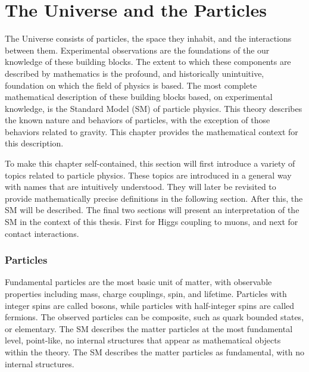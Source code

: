 
\section{The Universe and the Particles}

The Universe consists of particles, the space they inhabit, and the interactions between them.
Experimental observations are the foundations of the our knowledge of these building blocks.
The extent to which these components are described by mathematics is the profound, and historically unintuitive, foundation on which the field of physics is based.
The most complete mathematical description of these building blocks based, on experimental knowledge, is the Standard Model (SM) of particle physics.
This theory describes the known nature and behaviors of particles, with the exception of those behaviors related to gravity.
This chapter provides the mathematical context for this description.

To make this chapter self-contained, this section will first introduce a variety of topics related to particle physics.
These topics are introduced in a general way with names that are intuitively understood.
They will later be revisited to provide mathematically precise definitions in the following section.
After this, the SM will be described.
The final two sections will present an interpretation of the SM in the context of this thesis. First for Higgs coupling to muons, and next for contact interactions.

\subsubsection{Particles}
Fundamental particles are the most basic unit of matter, with observable properties including mass, charge couplings, spin, and lifetime.
Particles with integer spins are called bosons, while particles with half-integer spins are called fermions.
The observed particles can be composite, such as quark bounded states, or elementary.
The SM describes the matter particles at the most fundamental level, point-like, no internal structures that appear as mathematical objects within the theory.
The SM describes the matter particles as fundamental, with no internal structures.


